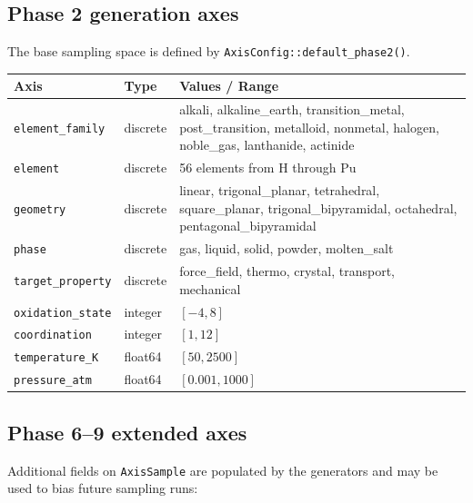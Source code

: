 \documentclass[11pt,letterpaper]{article}
\begin{document}
\subsection{Phase 2 generation axes}

The base sampling space is defined by \texttt{AxisConfig::default\_phase2()}.

\begin{center}
\begin{longtable}{llp{6.5cm}}
\toprule
Axis & Type & Values / Range \\
\midrule
\texttt{element\_family}  & discrete  & alkali, alkaline\_earth, transition\_metal,
										post\_transition, metalloid, nonmetal,
										halogen, noble\_gas, lanthanide, actinide \\
\texttt{element}          & discrete  & 56 elements from H through Pu \\
\texttt{geometry}         & discrete  & linear, trigonal\_planar, tetrahedral,
										square\_planar, trigonal\_bipyramidal,
										octahedral, pentagonal\_bipyramidal \\
\texttt{phase}            & discrete  & gas, liquid, solid, powder, molten\_salt \\
\texttt{target\_property} & discrete  & force\_field, thermo, crystal, transport, mechanical \\
\texttt{oxidation\_state} & integer   & $[-4, 8]$ \\
\texttt{coordination}     & integer   & $[1, 12]$ \\
\texttt{temperature\_K}   & float64   & $[50, 2500]$ \\
\texttt{pressure\_atm}    & float64   & $[0.001, 1000]$ \\
\bottomrule
\end{longtable}
\end{center}

\subsection{Phase 6--9 extended axes}

Additional fields on \texttt{AxisSample} are populated by the generators
and may be used to bias future sampling runs:
\end{document}
